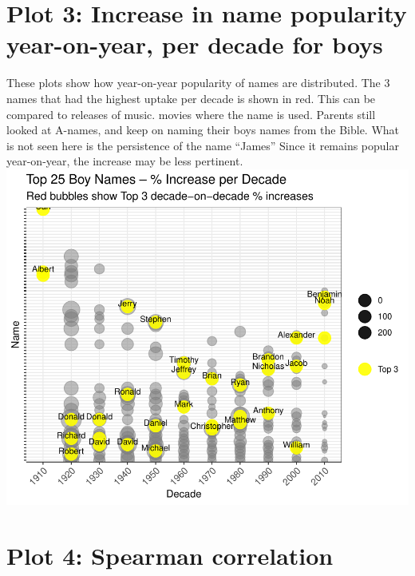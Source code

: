\documentclass[11pt,preprint]{elsarticle}
\numberwithin{equation}{section}
\numberwithin{figure}{section}
\numberwithin{table}{section}
\begin{document}
\section{Plot 3: Increase in name popularity year-on-year, per decade
for
boys}\label{plot-3-increase-in-name-popularity-year-on-year-per-decade-for-boys}

These plots show how year-on-year popularity of names are distributed.
The 3 names that had the highest uptake per decade is shown in red. This
can be compared to releases of music. movies where the name is used.
Parents still looked at A-names, and keep on naming their boys names
from the Bible. What is not seen here is the persistence of the name
``James'' Since it remains popular year-on-year, the increase may be
less pertinent.
\includegraphics{Question1_files/figure-latex/unnamed-chunk-3-1.pdf}

\newpage

\section{Plot 4: Spearman
correlation}\label{plot-4-spearman-correlation}
\end{document}
